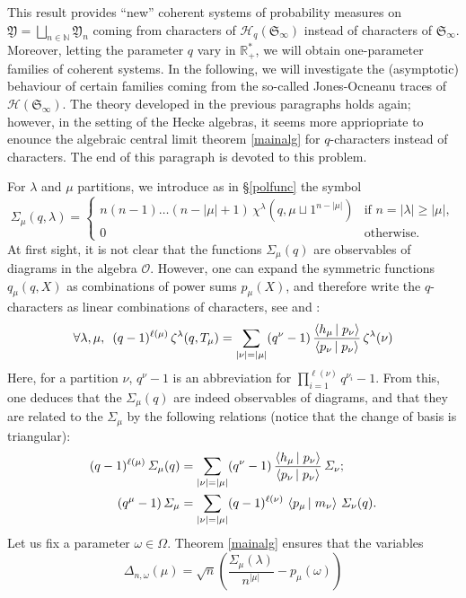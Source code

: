 \documentclass[smallextended,nospthms]{svjour3}
\theoremstyle{remark}
\newcommand{\N}{\mathbb{N}}
\newcommand{\R}{\mathbb{R}}
\newcommand{\hecke}{\mathscr{H}}
\newcommand{\sym}{\mathfrak{S}}
\newcommand{\ym}{\mathfrak{Y}}
\newcommand{\obs}{\mathscr{O}}
\newcommand{\scal}[2]{\left\langle #1\vphantom{#2}\,\right |\left.#2 \vphantom{#1}\right\rangle}
\begin{document}
This result provides ``new'' coherent systems of probability measures on $\ym=\bigsqcup_{n \in \N}\ym_{n}$ coming from characters of $\hecke_{q}(\sym_{\infty})$ instead of characters of $\sym_{\infty}$. Moreover, letting the parameter $q$ vary in $\R_{+}^{*}$, we will obtain one-parameter families of coherent systems. In the following, we will investigate the (asymptotic) behaviour of certain families coming from the so-called Jones-Ocneanu traces of $\hecke(\sym_{\infty})$.  The theory developed in the previous paragraphs holds again; however, in the setting of the Hecke algebras, it seems more appriopriate to enounce the algebraic central limit theorem \ref{mainalg} for $q$-characters instead of characters. The end of this paragraph is devoted to this problem.\bigskip\bigskip


For $\lambda$ and $\mu$ partitions, we introduce as in \S\ref{polfunc} the symbol
$$\varSigma_{\mu}(q,\lambda)=\begin{cases}
n(n-1)\ldots (n-|\mu|+1)\,\chi^{\lambda}(q,\mu \sqcup 1^{n-|\mu|}) &\text{if }n=|\lambda|\geq |\mu|,\\
0&\text{otherwise}.
\end{cases}$$
At first sight, it is not clear that the functions $\varSigma_{\mu}(q)$ are observables of diagrams in the algebra $\obs$. However, one can expand the symmetric functions $q_{\mu}(q,X)$ as combinations of power sums $p_{\mu}(X)$, and therefore write the $q$-characters as linear combinations of characters, see \cite[Theorem 5.4]{Ram91} and \cite[Proposition 10]{FM10}:
$$\forall \lambda,\mu,\,\,\,(q-1)^{\ell(\mu)}\,\zeta^{\lambda}(q,T_{\mu})=\sum_{|\nu|=|\mu|} (q^{\nu}-1)\,\frac{\scal{h_{\mu}}{p_{\nu}}}{\scal{p_{\nu}}{p_{\nu}}}\,\zeta^{\lambda}(\nu)$$
Here, for a partition $\nu$, $q^{\nu}-1$ is an abbreviation for $\prod_{i=1}^{\ell(\nu)}q^{\nu_{i}}-1$. From this, one deduces that the $\varSigma_{\mu}(q)$ are indeed observables of diagrams, and that they are related to the $\varSigma_{\mu}$ by the following relations (notice that the change of basis is triangular):
\begin{align*}
(q-1)^{\ell(\mu)}\,\varSigma_{\mu}(q) &= \sum_{|\nu|=|\mu|} (q^{\nu}-1)\,\frac{\scal{h_{\mu}}{p_{\nu}}}{\scal{p_{\nu}}{p_{\nu}}}\,\varSigma_{\nu};\\
(q^{\mu}-1)\,\varSigma_{\mu}&=\sum_{|\nu|=|\mu|} (q-1)^{\ell(\nu)}\,\scal{p_{\mu}}{m_{\nu}}\,\varSigma_{\nu}(q).
\end{align*}
Let us fix a parameter $\omega \in \Omega$. Theorem \ref{mainalg} ensures that the variables 
$$\Delta_{n,\omega}(\mu)=\sqrt{n}\left(\frac{\varSigma_{\mu}(\lambda)}{n^{|\mu|}}-p_{\mu}(\omega)\right)$$
\end{document}
